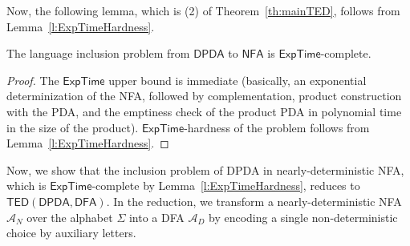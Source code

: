 \documentclass{CSML}
\newcommand{\aut}{\mathcal{A}}
\newcommand{\EXPTIME}{\textsf{ExpTime}}
\newcommand{\DFA}{\mathsf{DFA}}
\newcommand{\NFA}{\mathsf{NFA}}
\newcommand{\DPDA}{\mathsf{DPDA}}
\newcommand{\TED}{\mathsf{TED}}
\begin{document}
Now, the following lemma, which is (2) of Theorem~\ref{th:mainTED}, 
follows from Lemma~\ref{l:ExpTimeHardness}.

\begin{lem}
The language inclusion problem from $\DPDA$ to $\NFA$ is $\EXPTIME$-complete.
\label{th:inlusionExpTimeHard}
\end{lem}
\begin{proof}
\newcommand{\Ap}{\mathcal{A}_p}
\newcommand{\Ar}{\mathcal{A}_r}
\newcommand{\Ad}{\mathcal{A}_d}
The $\EXPTIME$ upper bound is immediate (basically, an exponential 
determinization of the NFA, followed by complementation, 
product construction with the PDA, and the emptiness check of the product 
PDA in polynomial time in the size of the product).
$\EXPTIME$-hardness of the problem follows from Lemma~\ref{l:ExpTimeHardness}.
\end{proof}

Now, we show that the inclusion problem of DPDA in nearly-deterministic NFA,
which is $\EXPTIME$-complete by Lemma~\ref{l:ExpTimeHardness},
reduces to $\TED(\DPDA,\DFA)$. In the reduction, we transform a nearly-deterministic NFA $\aut_N$ over the alphabet $\Sigma$
into a DFA $\aut_D$ by encoding a single non-deterministic choice by auxiliary letters. 
\end{document}
